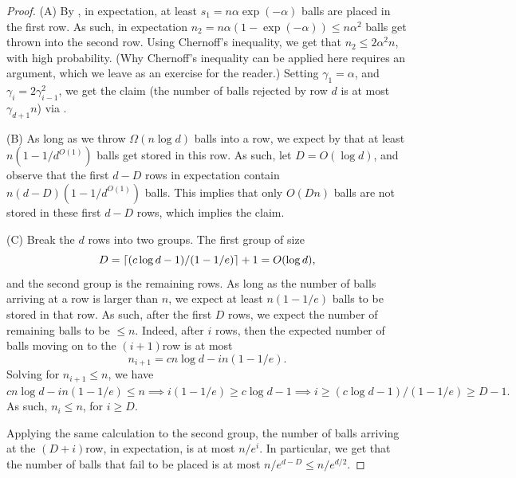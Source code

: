 \begin{proof}
    (A) By , in expectation, at least
    $s_1 = n\alpha \exp(-\alpha)$ balls are placed in the first row. As such, in
    expectation $n_2 = n \alpha (1 - \exp( -\alpha)) \leq n\alpha^2$ balls get thrown into
    the second row. Using Chernoff's inequality, we get that
    $n_2 \leq 2 \alpha^{2}n$, with high probability. (Why Chernoff's
    inequality can be applied here requires an argument, which we leave
    as an exercise for the reader.)
    Setting $\gamma_1 = \alpha$, and $\gamma_i = 2 \gamma_{i-1}^2$, we get the
    claim (the number of balls rejected by row $d$ is at most
    $\gamma_{d+1} n$) via .

    
    (B) As long as we throw $\Omega( n \log d)$ balls into a row, we
    expect by  that at least $n(1-1/d^{O(1)})$
    balls get stored in this row. As such, let $D = O(\log d )$,
    and observe that the first $d-D$ rows in expectation contain
    $n(d-D)(1-1/d^{O(1)})$ balls. This implies that only $O(D n)$ balls are
    not stored in these first $d-D$ rows, which implies the claim.


    (C) Break the $d$ rows into two groups. The first group of size
    \begin{equation*}
        D= \left\lceil {(c \log d-1)/(1-1/e)} \right\rceil + 1 = O(\log d),
    \end{equation*}
    and the second group is the remaining rows. As long as the number of
    balls arriving at a row is larger than $n$, we expect at least
    $n(1-1/e)$ balls to be stored in that row. As such, after the first
    $D$ rows, we expect the number of remaining balls to be $\leq
    n$. Indeed, after $i$ rows, then the expected number of balls moving
    on to the $(i+1)$\th row is at most
    \begin{equation*}
        n_{i+1} = cn \log d - i n(1-1/e).
    \end{equation*}
    Solving for $n_{i+1} \leq n$, we have
    \begin{math}
        cn \log d - i n(1-1/e) \leq n \implies i (1-1/e) \geq c \log
        d-1 \implies i \geq (c \log d-1)/(1-1/e) \geq D - 1.
    \end{math}    
    As such, $n_i \leq n$, for $i \geq D$.
    
    Applying the same calculation to the second group, the number of
    balls arriving at the $(D+i)$\th row, in expectation, is at most
    $n/e^i$. In particular, we get that the number of balls that fail to
    be placed is at most $n/e^{d-D} \leq n/e^{d/2}$.
\end{proof}


